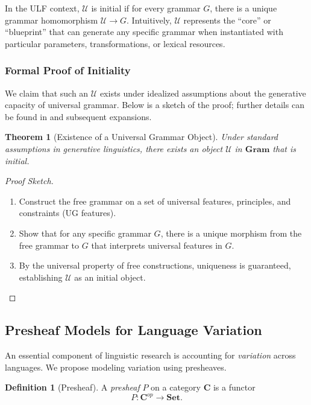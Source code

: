 \documentclass[12pt]{article}
\theoremstyle{plain}
\newtheorem{theorem}{Theorem}
\theoremstyle{definition}
\newtheorem{definition}{Definition}
\begin{document}
In the ULF context, \(\mathcal{U}\) is initial if for every grammar \(G\), there is a unique grammar homomorphism \(\mathcal{U} \to G\). Intuitively, \(\mathcal{U}\) represents the ``core'' or ``blueprint'' that can generate any specific grammar when instantiated with particular parameters, transformations, or lexical resources.

\subsubsection{Formal Proof of Initiality}
We claim that such an \(\mathcal{U}\) exists under idealized assumptions about the generative capacity of universal grammar. Below is a sketch of the proof; further details can be found in \cite{original} and subsequent expansions.

\begin{theorem}[Existence of a Universal Grammar Object]
Under standard assumptions in generative linguistics, there exists an object \(\mathcal{U}\) in \(\mathbf{Gram}\) that is initial.
\end{theorem}

\begin{proof}[Proof Sketch]
\begin{enumerate}
    \item Construct the free grammar on a set of universal features, principles, and constraints (UG features).
    \item Show that for any specific grammar \(G\), there is a unique morphism from the free grammar to \(G\) that interprets universal features in \(G\).
    \item By the universal property of free constructions, uniqueness is guaranteed, establishing \(\mathcal{U}\) as an initial object.
\end{enumerate}
\end{proof}

\subsection{Presheaf Models for Language Variation}
An essential component of linguistic research is accounting for \emph{variation} across languages. We propose modeling variation using presheaves.

\begin{definition}[Presheaf]
A \emph{presheaf} \(P\) on a category \(\mathbf{C}\) is a functor
\[
P: \mathbf{C}^{op} \to \mathbf{Set}.
\]
\end{definition}
\end{document}
